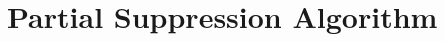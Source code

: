 \section{Partial Suppression Algorithm}
\label{sec:algo}
\renewcommand{\algorithmicforall}{\textbf{for each}}






